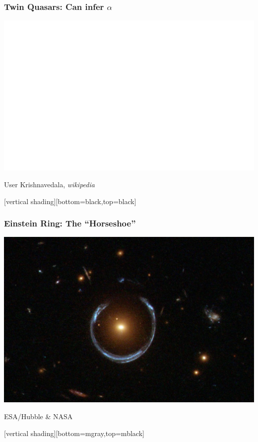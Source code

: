 \documentclass{beamer}
\begin{document}
\frame
{
    \frametitle{Twin Quasars: {\color{gold} Can infer $\alpha$}}

    \begin{center}
        \includegraphics[width=\textwidth]{glensing.png}
    \end{center}
        \hfill  {\tiny User Krishnavedala, {\em wikipedia} }
}


{
    [vertical shading][bottom=black,top=black]
	
    \frame
    {
        \frametitle{Einstein Ring: The ``Horseshoe''}

        \begin{center}
            \includegraphics[height=0.7\textheight]{A_Horseshoe_Einstein_Ring_from_Hubble.JPG}

            {\tiny \hfill ESA/Hubble \& NASA}
        \end{center}
    }

    [vertical shading][bottom=mgray,top=mblack]

}
\end{document}
